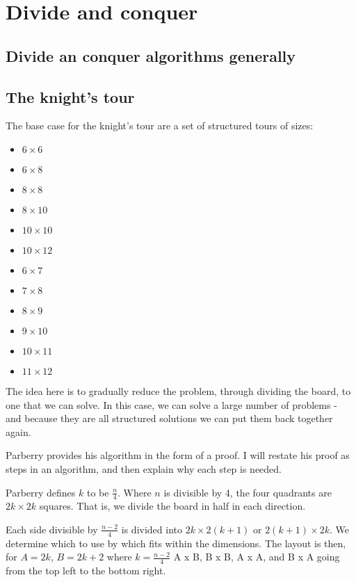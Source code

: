 \documentclass[11pt, a4paper]{article}
\begin{document}
\section{Divide and conquer}

\subsection{Divide an conquer algorithms generally}



\subsection{The knight's tour}

The base case for the knight's tour are a set of structured tours of sizes:
\begin{itemize}
\item $6 \times 6$
\item $6 \times 8$
\item $8 \times 8$
\item $8 \times 10$
\item $10 \times 10$
\item $10 \times 12$
\item $6 \times 7$
\item $7 \times 8$
\item $8 \times 9$
\item $9 \times 10$
\item $10 \times 11$
\item $11 \times 12$
\end{itemize}


The idea here is to gradually reduce the problem, through dividing the board, to one that we can solve. In this case, we can solve a large number of problems - and because they are all structured solutions we can put them back together again.

Parberry provides his algorithm in the form of a proof. I will restate his proof as steps in an algorithm, and then explain why each step is needed.

Parberry defines $k$ to be $\frac{n}{4}$.
Where $n$ is divisible by 4, the four quadrants are $2k \times 2k$ squares. That is, we divide the board in half in each direction.

Each side divisible by $\frac{n - 2}{4}$ is divided into $2k \times 2(k + 1)$ or $2(k + 1) \times 2k$. We determine which to use by which fits within the dimensions. The layout is then, for $A = 2k$, $B = 2k + 2$ where $k = \frac{n - 2}{4}$ A x B, B x B, A x A, and B x A going from the top left to the bottom right.
\end{document}
